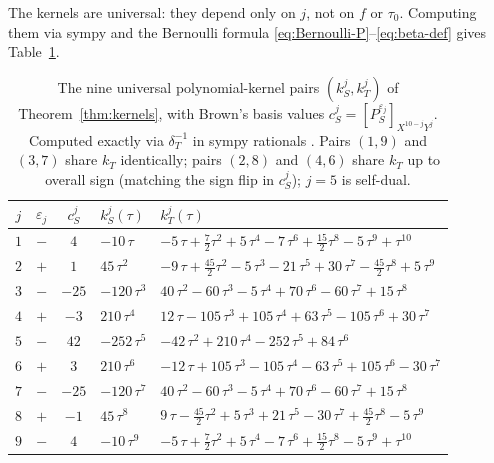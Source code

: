 \documentclass[11pt,letterpaper]{article}
\newcommand{\eps}{\varepsilon}
\begin{document}
The kernels are universal: they depend only on $j$, not on $f$ or
$\tau_0$.  Computing them via sympy and the Bernoulli formula
\eqref{eq:Bernoulli-P}--\eqref{eq:beta-def} \cite{KernelScript} gives
Table~\ref{tab:kernels}.

\begin{table}[h]\centering\renewcommand{\arraystretch}{1.25}
\begin{tabular}{cccll}
\toprule
$j$ & $\eps_j$ & $c_S^j$ & $k_S^{j}(\tau)$ & $k_T^{j}(\tau)$ \\
\midrule
$1$ & $-$ & $4$    & $-10\,\tau$        & $-5\,\tau + \tfrac{7}{2}\tau^{2} + 5\,\tau^{4} - 7\,\tau^{6} + \tfrac{15}{2}\tau^{8} - 5\,\tau^{9} + \tau^{10}$ \\
$2$ & $+$ & $1$    & $45\,\tau^{2}$     & $-9\,\tau + \tfrac{45}{2}\tau^{2} - 5\,\tau^{3} - 21\,\tau^{5} + 30\,\tau^{7} - \tfrac{45}{2}\tau^{8} + 5\,\tau^{9}$ \\
$3$ & $-$ & $-25$  & $-120\,\tau^{3}$   & $40\,\tau^{2} - 60\,\tau^{3} - 5\,\tau^{4} + 70\,\tau^{6} - 60\,\tau^{7} + 15\,\tau^{8}$ \\
$4$ & $+$ & $-3$   & $210\,\tau^{4}$    & $12\,\tau - 105\,\tau^{3} + 105\,\tau^{4} + 63\,\tau^{5} - 105\,\tau^{6} + 30\,\tau^{7}$ \\
$5$ & $-$ & $42$   & $-252\,\tau^{5}$   & $-42\,\tau^{2} + 210\,\tau^{4} - 252\,\tau^{5} + 84\,\tau^{6}$ \\
$6$ & $+$ & $3$    & $210\,\tau^{6}$    & $-12\,\tau + 105\,\tau^{3} - 105\,\tau^{4} - 63\,\tau^{5} + 105\,\tau^{6} - 30\,\tau^{7}$ \\
$7$ & $-$ & $-25$  & $-120\,\tau^{7}$   & $40\,\tau^{2} - 60\,\tau^{3} - 5\,\tau^{4} + 70\,\tau^{6} - 60\,\tau^{7} + 15\,\tau^{8}$ \\
$8$ & $+$ & $-1$   & $45\,\tau^{8}$     & $9\,\tau - \tfrac{45}{2}\tau^{2} + 5\,\tau^{3} + 21\,\tau^{5} - 30\,\tau^{7} + \tfrac{45}{2}\tau^{8} - 5\,\tau^{9}$ \\
$9$ & $-$ & $4$    & $-10\,\tau^{9}$    & $-5\,\tau + \tfrac{7}{2}\tau^{2} + 5\,\tau^{4} - 7\,\tau^{6} + \tfrac{15}{2}\tau^{8} - 5\,\tau^{9} + \tau^{10}$ \\
\bottomrule
\end{tabular}
\caption{The nine universal polynomial-kernel pairs $(k_S^j, k_T^j)$ of
Theorem~\ref{thm:kernels}, with Brown's basis values
$c_S^j = [P^{\eps_j}_S]_{X^{10-j}Y^j}$.  Computed exactly via
$\delta_T^{-1}$ in sympy rationals \cite{KernelScript}.  Pairs $(1, 9)$
and $(3, 7)$ share $k_T$ identically; pairs $(2, 8)$ and $(4, 6)$ share
$k_T$ up to overall sign (matching the sign flip in $c_S^j$); $j = 5$
is self-dual.}
\label{tab:kernels}
\end{table}
\end{document}
